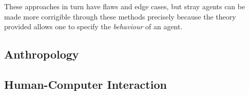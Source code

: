 These approaches in turn have flaws and edge cases, but stray agents can be made more corrigible through these methods precisely because the theory provided allows one to specify the \emph{behaviour} of an agent.

\subsection{Anthropology}


\subsection{Human-Computer Interaction} %
